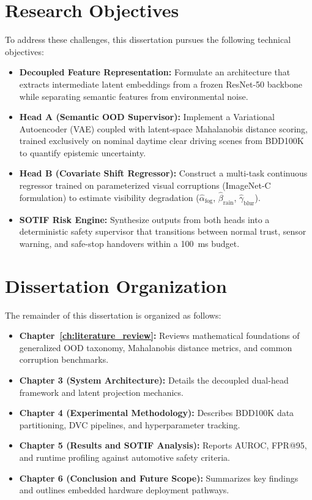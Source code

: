 \section{Research Objectives}
To address these challenges, this dissertation pursues the following technical objectives:
\begin{itemize}
    \item \textbf{Decoupled Feature Representation:} Formulate an architecture that extracts intermediate latent embeddings from a frozen ResNet-50 backbone while separating semantic features from environmental noise.
    \item \textbf{Head A (Semantic OOD Supervisor):} Implement a Variational Autoencoder (VAE) coupled with latent-space Mahalanobis distance scoring, trained exclusively on nominal daytime clear driving scenes from BDD100K to quantify epistemic uncertainty.
    \item \textbf{Head B (Covariate Shift Regressor):} Construct a multi-task continuous regressor trained on parameterized visual corruptions (ImageNet-C formulation) to estimate visibility degradation ($\hat{\alpha}_{\text{fog}}$, $\hat{\beta}_{\text{rain}}$, $\hat{\gamma}_{\text{blur}}$).
    \item \textbf{SOTIF Risk Engine:} Synthesize outputs from both heads into a deterministic safety supervisor that transitions between normal trust, sensor warning, and safe-stop handovers within a 100~ms budget.
\end{itemize}

\section{Dissertation Organization}
The remainder of this dissertation is organized as follows:
\begin{itemize}
    \item \textbf{Chapter~\ref{ch:literature_review}:} Reviews mathematical foundations of generalized OOD taxonomy, Mahalanobis distance metrics, and common corruption benchmarks.
    \item \textbf{Chapter 3 (System Architecture):} Details the decoupled dual-head framework and latent projection mechanics.
    \item \textbf{Chapter 4 (Experimental Methodology):} Describes BDD100K data partitioning, DVC pipelines, and hyperparameter tracking.
    \item \textbf{Chapter 5 (Results and SOTIF Analysis):} Reports AUROC, FPR@95, and runtime profiling against automotive safety criteria.
    \item \textbf{Chapter 6 (Conclusion and Future Scope):} Summarizes key findings and outlines embedded hardware deployment pathways.
\end{itemize}
